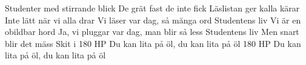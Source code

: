 



\songtext{}Studenter med stirrande blick
De grät fast de inte fick Läslistan ger kalla kärar
Inte lätt när vi alla drar
Vi läser var dag, sả mănga ord
Studentens liv
Vi är en obildbar hord
Ja, vi pluggar var dag, man blir sả less
Studentens liv
Men snart blir det mäss
Skit i 180 HP
Du kan lita pả öl, du kan lita pả öl
180 HP
Du kan lita pả öl, du kan lita pả öl
